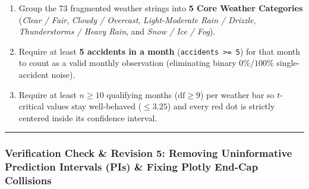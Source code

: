 \documentclass[
  letterpaper,
  DIV=11,
  numbers=noendperiod]{scrartcl}
\providecommand{\tightlist}{%
  \setlength{\itemsep}{0pt}\setlength{\parskip}{0pt}}
\begin{document}
\begin{itemize}
\begin{itemize}
    \begin{enumerate}
    \def\labelenumi{\arabic{enumi}.}
    \tightlist
    \item
      Group the 73 fragmented weather strings into \textbf{5 Core
      Weather Categories} (\emph{Clear / Fair}, \emph{Cloudy /
      Overcast}, \emph{Light-Moderate Rain / Drizzle},
      \emph{Thunderstorms / Heavy Rain}, and \emph{Snow / Ice / Fog}).
    \item
      Require at least \textbf{5 accidents in a month}
      (\texttt{accidents\ \textgreater{}=\ 5}) for that month to count
      as a valid monthly observation (eliminating binary \(0\%/100\%\)
      single-accident noise).
    \item
      Require at least \(n \ge 10\) qualifying months
      (\(\text{df} \ge 9\)) per weather bar so \(t\)-critical values
      stay well-behaved (\(\le 3.25\)) and every red dot is strictly
      centered inside its confidence interval.
    \end{enumerate}
  \end{itemize}
\end{itemize}

\begin{center}\rule{0.5\linewidth}{0.5pt}\end{center}

\subsubsection{Verification Check \& Revision 5: Removing Uninformative
Prediction Intervals (PIs) \& Fixing Plotly End-Cap
Collisions}\label{verification-check-revision-5-removing-uninformative-prediction-intervals-pis-fixing-plotly-end-cap-collisions}
\end{document}
